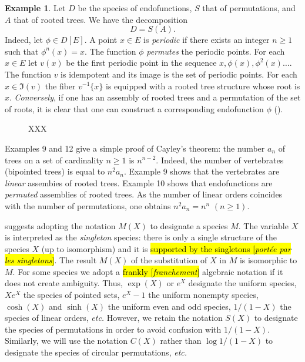 \documentclass{amsart}
\theoremstyle{definition}
\newtheorem{ex}{Example}
\theoremstyle{remark}
\newcommand{\trans}[2]{\hl{#1 [\textit{#2}]}}
\newcommand{\term}[1]{\emph{#1}}
\newcommand{\pref}[1]{\prettyref{#1}}
\newcommand{\etc}{\textit{etc.}\xspace}
\begin{document}
\begin{ex} \label{ex:endo-perm-of-rooted}
Let $D$ be the species of endofunctions, $S$ that of
permutations, and $A$ that of rooted trees. We have the decomposition
\[ D = S(A). \] Indeed, let $\phi \in D [E]$. A point $x \in E$ is
\term{periodic} if there exists an integer $n \geq 1$ such that
$\phi^n(x) = x$. The function $\phi$ \term{permutes} the periodic
points.  For each $x \in E$ let $v (x)$ be the first periodic point in
the sequence $x, \phi(x), \phi^2(x) \dots$. The function $v$ is
idempotent and its image is the set of periodic points. For each $x
\in \Im (v)$ the fiber $v^{-1}\{x\}$ is equipped with a rooted tree
structure whose root is $x$. \emph{Conversely}, if one has an assembly
of rooted trees and a permutation of the set of roots, it is clear
that one can construct a corresponding endofunction $\phi$
(\pref{fig:perm-of-rooted-trees}).
\end{ex}

\begin{figure}
  \centering
  \caption{XXX}
  \label{fig:perm-of-rooted-trees}
\end{figure}

Examples 9 and 12 give a simple proof of Cayley's theorem: the number
$a_n$ of trees on a set of cardinality $n \geq 1$ is
$n^{n-2}$. Indeed, the number of vertebrates (bipointed trees) is
equal to $n^2a_n$.  Example 9 shows that the vertebrates are
\emph{linear} assembies of rooted trees.  Example 10 shows that
endofunctions are \emph{permuted} assemblies of rooted trees.  As the
number of linear orders coincides with the number of permutations, one
obtains $n^2 a_n = n^n$ $(n \geq 1)$.

\pref{thm:card-subst} suggests adopting the notation $M (X)$ to
designate a species $M$. The variable $X$ is interpreted as the
\emph{singleton} species: there is only a single structure of the
species $X$ (up to isomorphism) and it is \trans{supported by the
  singletons}{port\'ee par les singletons}.  The result $M (X)$ of the
substitution of $X$ in $M$ is isomorphic to $M$. For some species we
adopt a \trans{frankly}{franchement} algebraic notation if it does not
create ambiguity. Thus, $\exp (X)$ or $e^X$ designate the uniform
species, $X e^X$ the species of pointed sets, $e^X - 1$ the uniform
nonempty species, $\cosh (X)$ and $\sinh (X)$ the uniform even and odd
species, $1/(1 - X)$ the species of linear orders, \etc However, we
retain the notation $S (X)$ to designate the species of permutations
in order to avoid confusion with $1/(1-X)$. Similarly, we will use the
notation $C (X)$ rather than $\log 1/(1-X)$ to designate the species
of circular permutations, \etc
\end{document}
